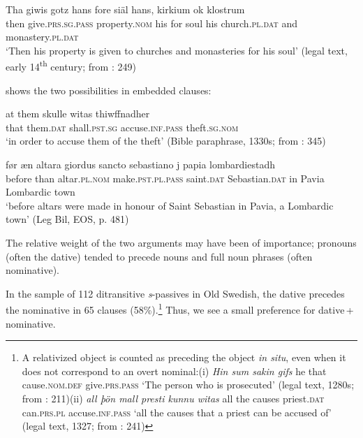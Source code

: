 \documentclass[output=paper]{langscibook}
\begin{document}
\ex \label{ex:falk:15b}
\gll Tha  giwis          gotz        hans  fore  siäl  hans,  kirkium ok    klostrum\\
    then  give.\textsc{prs.sg.pass}  property.\textsc{nom}  his    for    soul  his    church.\textsc{pl.dat}   and  monastery.\textsc{pl.dat}\\
\glt ‘Then his property is given to churches and monasteries for his soul’ (legal text, early 14\textsuperscript{th} century; from \citealt{Holm1952}: 249)
\z
\z

          shows the two possibilities in embedded clauses:

\ea%
    \label{ex:falk:16}

\ea
\gll at    them    skulle        witas            thiwffnadher\\
      that  them.\textsc{dat}  shall.\textsc{pst.sg}  accuse.\textsc{inf.pass}    theft.\textsc{sg.nom}\\
\glt ‘in order to accuse them of the theft’ (Bible paraphrase, 1330s; from \citealt{Holm1952}: 345)

\ex
\gll før      æn    altara        giordus          sancto      sebastiano j  papia   lombardiestadh\\
      before  than     altar\textsc{.pl.nom}  make.\textsc{pst.pl.pass}  saint.\textsc{dat}  Sebastian.\textsc{dat}       in Pavia    Lombardic    town\\
\glt ‘before altars were made in honour of Saint Sebastian in Pavia, a Lombardic town’ (Leg Bil, EOS, p. 481)
\z
\z


The relative weight of the two arguments may have been of importance; pronouns (often the dative) tended to precede nouns and full noun phrases (often nominative).  


In the sample of 112 ditransitive \textit{s}{}-passives in Old Swedish, the dative precedes the nominative in 65 clauses (58\%).\footnote{A relativized object is counted as preceding the object \textit{in situ}, even when it does not correspond to an overt nominal:(i)  \textit{Hin  sum  sakin          gifs}   he    that  cause.\textsc{nom.def}  give.\textsc{prs.pass}  ‘The person who is prosecuted’ (legal text, 1280s; from \citealt{Holm1952}: 211)(ii)  \textit{all    þön   mall  presti      kunnu  witas}   all    the    causes  priest.\textsc{dat}    can.\textsc{prs.pl}  accuse.\textsc{inf.pass}  ‘all the causes that a priest can be accused of’ (legal text, 1327; from \citealt{Holm1952}: 241)} Thus, we see a small preference for dative\,+\,nominative.
\end{document}
